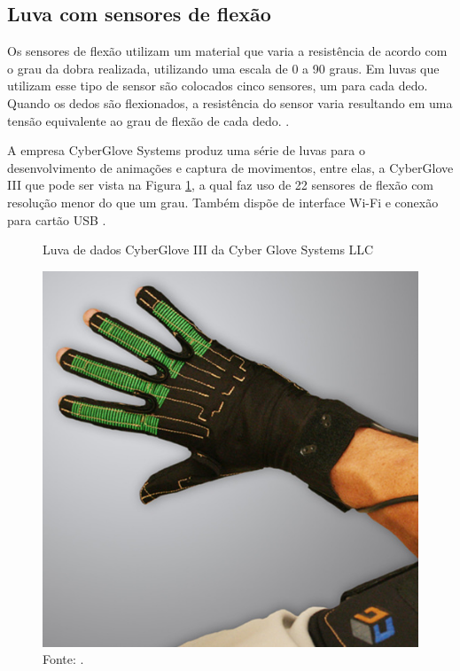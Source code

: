 	\subsection{Luva com sensores de flexão}	
Os sensores de flexão  utilizam um material que varia a resistência de acordo com o grau da dobra realizada, utilizando uma 
escala de 0 a 90 graus. Em luvas que utilizam esse tipo de sensor são colocados cinco sensores, um para cada dedo. Quando os dedos 
são flexionados, a resistência do sensor varia resultando em uma tensão equivalente ao grau de flexão de cada dedo. 
\cite{baseadoruani}.
	
A empresa CyberGlove Systems produz uma série de luvas para o desenvolvimento de animações e captura de movimentos, entre elas, a CyberGlove III que pode ser vista na Figura \ref{fig:CyberGlove}, a qual faz uso de 22 sensores de flexão com resolução menor do que um grau. Também dispõe de interface 
Wi-Fi e conexão para cartão USB \cite{cGlove}.
	
	
	\begin{figure}[H]
		\vspace{4mm}
		\centering
		\caption{Luva de dados CyberGlove III da Cyber Glove Systems LLC}
		\label{fig:CyberGlove}
		\includegraphics[scale=0.3]{imagens/CyberGlove.jpeg}		
		\caption*{Fonte: .}
	\end{figure}
	

